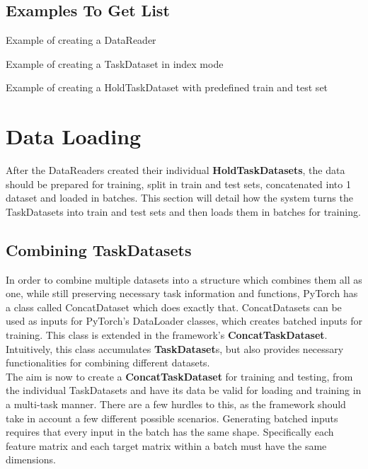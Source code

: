 
\subsection{Examples To Get List}
Example of creating a DataReader

Example of creating a TaskDataset in index mode

Example of creating a HoldTaskDataset with predefined train and test set

\section{Data Loading} \label{Impl:DataLoad}

After the DataReaders created their individual \textbf{HoldTaskDatasets}, the data should be prepared for training, split in train and test sets, concatenated into 1 dataset and loaded in batches.  This section will detail how the system turns the TaskDatasets into train and test sets and then loads them in batches for training. \\

\subsection{Combining TaskDatasets} \label{Impl:DataLoad:Combining}

In order to combine multiple datasets into a structure which combines them all as one, while still preserving necessary task information and functions, PyTorch has a class called ConcatDataset which does exactly that. ConcatDatasets can be used as inputs for PyTorch's DataLoader classes, which creates batched inputs for training. This class is extended in the framework's \textbf{ConcatTaskDataset}. Intuitively, this class accumulates \textbf{TaskDataset}s, but also provides necessary functionalities for combining different datasets. \\

The aim is now to create a \textbf{ConcatTaskDataset} for training and testing, from the individual TaskDatasets and have its data be valid for loading and training in a multi-task manner. There are a few hurdles to this, as the framework should take in account a few different possible scenarios. Generating batched inputs requires that every input in the batch has the same shape. Specifically each feature matrix and each target matrix within a batch must have the same dimensions. \\

